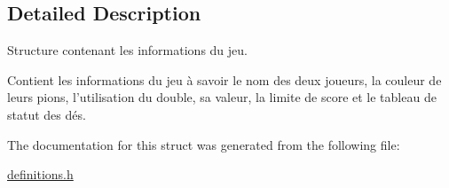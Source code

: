 \subsection{Detailed Description}
Structure contenant les informations du jeu. 

Contient les informations du jeu à savoir le nom des deux joueurs, la couleur de leurs pions, l'utilisation du double, sa valeur, la limite de score et le tableau de statut des dés. 

The documentation for this struct was generated from the following file:\begin{DoxyCompactItemize}
\item 
\hyperlink{definitions_8h}{definitions.h}\end{DoxyCompactItemize}
